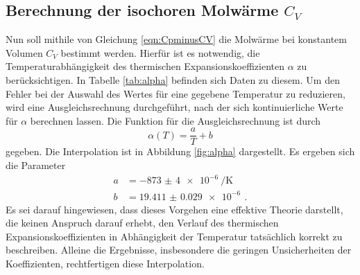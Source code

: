 \subsection{Berechnung der isochoren Molwärme $C_V$}
\label{subsec:cv}

Nun soll mithile von Gleichung \eqref{eqn:CpminusCV} die Molwärme bei konstantem Volumen $C_V$ bestimmt werden.
Hierfür ist es notwendig, die Temperaturabhängigkeit des thermischen Expansionskoeffizienten
$\alpha$ zu berücksichtigen. In Tabelle \ref{tab:alpha} befinden sich Daten zu diesem.
Um den Fehler bei der Auswahl des Wertes für eine gegebene Temperatur zu reduzieren, wird eine Ausgleichsrechnung durchgeführt, nach der sich kontinuierliche Werte für $\alpha$ berechnen lassen.
Die Funktion für die Ausgleichsrechnung ist durch
\begin{equation*}
  \alpha(T)=\frac{a}{T}+b
\end{equation*}
gegeben. Die Interpolation ist in Abbildung \ref{fig:alpha} dargestellt. Es ergeben sich die Parameter
\begin{align*}
  a&=\SI{-873(4)e-6}{\per\kelvin} \,\\
  b&=\SI{19.411(29)e-6}{} \,.
\end{align*}
Es sei darauf hingewiesen, dass dieses Vorgehen eine effektive Theorie darstellt, die keinen Anspruch darauf erhebt, den Verlauf des thermischen Expansionskoeffizienten in Abhängigkeit der Temperatur tatsächlich korrekt zu beschreiben. Alleine die Ergebnisse, insbesondere die geringen Unsicherheiten der Koeffizienten, rechtfertigen diese Interpolation.

